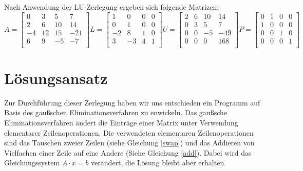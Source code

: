 \documentclass[course=erap]{aspdoc}
\begin{document}
Nach Anwendung der LU-Zerlegung ergeben sich folgende Matrizen:
  \begin{equation}
    A = \begin{bmatrix}
    0	& 3	 & 5  & 7 \\
    2	& 6	 & 10 & 14 \\
    -4	& 12 & 15 & -21\\
    6	& 9  & -5 & -7\\
    \end{bmatrix}
    L =
    \begin{bmatrix}
    1	& 0	 & 0  & 0 \\
    0	& 1	 & 0 & 0 \\
    -2	& 8 & 1 & 0\\
    3	& -3  & 4 & 1\\
    \end{bmatrix}
    U =
    \begin{bmatrix}
    2	& 6	 & 10 & 14 \\
    0	& 3	 & 5 &  7 \\
    0	& 0  & -5 & -49\\
    0	& 0  & 0 &  168\\
    \end{bmatrix}
    P =
    \begin{bmatrix}
    0	& 1	 & 0 & 0 \\
    1	& 0	 & 0 & 0 \\
    0	& 0  & 1 & 0\\
    0	& 0  & 0 & 1\\
    \end{bmatrix}
  \end{equation}
 
 

\section{Lösungsansatz}
Zur Durchführung dieser Zerlegung haben wir uns entschieden ein Programm auf Basis des gaußschen Eliminationsverfahren zu enwickeln.
Das gaußsche Eliminationsverfahren ändert die Einträge einer Matrix unter Verwendung elementarer Zeilenoperationen.
Die verwendeten elementaren Zeilenoperationen sind das Tauschen zweier Zeilen (siehe Gleichung \ref{swap}) und 
das Addieren von Vielfachen einer Zeile auf eine Andere (Siehe Gleichung \ref{add}). 
Dabei wird das Gleichungssystem $A \cdot x = b$ verändert, die Lösung bleibt aber erhalten.\\
\end{document}
